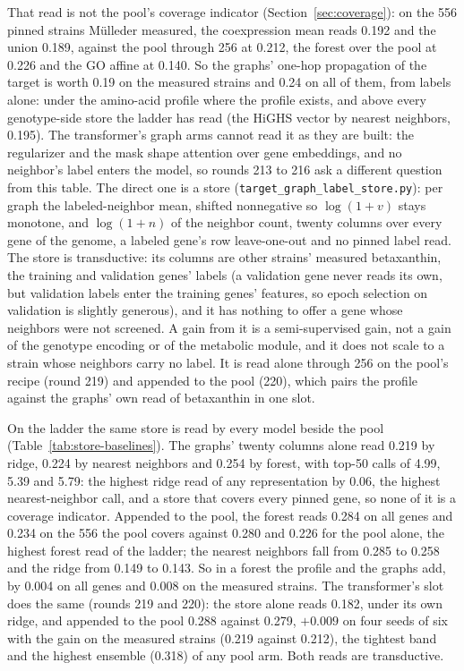That read is not the pool's coverage indicator (Section~\ref{sec:coverage}): on the 556
pinned strains M\"ulleder measured, the coexpression mean reads 0.192 and the union
0.189, against the pool through 256 at 0.212, the forest over the pool at 0.226 and the
GO affine at 0.140. So the graphs' one-hop propagation of the target is worth 0.19 on
the measured strains and 0.24 on all of them, from labels alone: under the amino-acid
profile where the profile exists, and above every genotype-side store the ladder has
read (the HiGHS vector by nearest neighbors, 0.195). The transformer's graph arms cannot
read it as they are built: the regularizer and the mask shape attention over gene
embeddings, and no neighbor's label enters the model, so rounds 213 to 216 ask a
different question from this table. The direct one is a store
(\texttt{target\_graph\_label\_store.py}): per graph the labeled-neighbor mean, shifted
nonnegative so $\log(1 + v)$ stays monotone, and $\log(1 + n)$ of the neighbor count,
twenty columns over every gene of the genome, a labeled gene's row leave-one-out and no
pinned label read. The store is transductive: its columns are other strains' measured
betaxanthin, the training and validation genes' labels (a validation gene never reads
its own, but validation labels enter the training genes' features, so epoch selection
on validation is slightly generous), and it has nothing to offer a gene whose neighbors
were not screened. A gain from it is a semi-supervised gain, not a gain of the
genotype encoding or of the metabolic module, and it does not scale to a strain whose
neighbors carry no label. It is read alone through 256 on the pool's recipe (round 219)
and appended to the pool (220), which pairs the profile against the graphs' own read of
betaxanthin in one slot.

On the ladder the same store is read by every model beside the pool
(Table~\ref{tab:store-baselines}). The graphs' twenty columns alone read 0.219 by
ridge, 0.224 by nearest neighbors and 0.254 by forest, with top-50 calls of 4.99, 5.39
and 5.79: the highest ridge read of any representation by 0.06, the highest
nearest-neighbor call, and a store that covers every pinned gene, so none of it is a
coverage indicator. Appended to the pool, the forest reads 0.284 on all genes and 0.234
on the 556 the pool covers against 0.280 and 0.226 for the pool alone, the highest
forest read of the ladder; the nearest neighbors fall from 0.285 to 0.258 and the ridge
from 0.149 to 0.143. So in a forest the profile and the graphs add, by 0.004 on all
genes and 0.008 on the measured strains. The transformer's slot does the same
(rounds 219 and 220): the store alone reads 0.182, under its own ridge, and appended to
the pool 0.288 against 0.279, $+0.009$ on four seeds of six with the gain on the
measured strains (0.219 against 0.212), the tightest band and the highest ensemble
(0.318) of any pool arm. Both reads are transductive.

